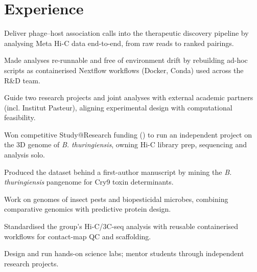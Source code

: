 \documentclass[]{deedy-resume-openfont}
\begin{document}
\begin{minipage}[t]{0.66\textwidth}


\section{Experience}

\descript{| \RolePhagos}
\location{\WhenPhagos}
\begin{tightemize}
\item Deliver phage--host association calls into the therapeutic discovery pipeline by analysing Meta Hi-C data end-to-end, from raw reads to ranked pairings.
\item Made analyses re-runnable and free of environment drift by rebuilding ad-hoc scripts as containerised Nextflow workflows (Docker, Conda) used across the R\&D team.
\item Guide two research projects and joint analyses with external academic partners (incl. Institut Pasteur), aligning experimental design with computational feasibility.
\end{tightemize}
\sectionsep

\begin{tightemize}
\item Won competitive Study@Research funding (\GrantStudyAtResearch{}) to run an independent project on the 3D genome of \textit{B. thuringiensis}, owning Hi-C library prep, sequencing and analysis solo.
\item Produced the dataset behind a first-author manuscript by mining the \textit{B. thuringiensis} pangenome for Cry9 toxin determinants.
\item Work on genomes of insect pests and biopesticidal microbes, combining comparative genomics with predictive protein design.
\item Standardised the group's Hi-C/3C-seq analysis with reusable containerised workflows for contact-map QC and scaffolding.
\end{tightemize}
\sectionsep

\descript{| \RoleDanube}
\location{\WhenDanube}
\begin{tightemize}
\item Design and run hands-on science labs; mentor students through independent research projects.
\end{tightemize}
\sectionsep


\end{minipage}
\end{document}
